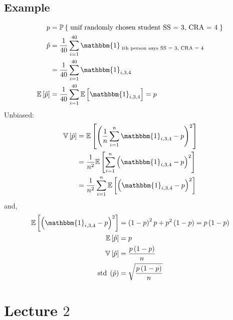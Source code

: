 \documentclass{article}
\begin{document}
\subsection{Example}
\begin{align*}
p  &= \mathbb{P}\left\{\text{\;unif randomly chosen student SS = 3, CRA = 4\;}\right\}
\\ \hat{p} &= \dfrac{1}{40} \displaystyle\sum_{i=1}^{40} \mathbbm{1}_{\text{\;ith person says SS = 3, CRA = 4\;}}
\\ &= \dfrac{1}{40} \displaystyle\sum_{i=1}^{40} \mathbbm{1}_{i,3,4}
\\ \mathbb{E}\left[\hat{p}\right] &= \dfrac{1}{40} \displaystyle\sum_{i=1}^{40} \mathbb{E}\left[\mathbbm{1}_{i,3,4}\right] = p 
\end{align*}
Unbiased:
\begin{align*}
\mathbb{V}\left[\hat{p}\right] &= \mathbb{E}\left[\left(\dfrac{1}{n} \displaystyle\sum_{i=1}^{n} \mathbbm{1}_{i,3,4} - p \right)^{2}\right]
\\ &= \dfrac{1}{n^{2}} \mathbb{E}\left[\displaystyle\sum_{i=1}^{n} \left(\mathbbm{1}_{i,3,4} - p\right)^{2}\right]
\\ &= \dfrac{1}{n^{2}} \displaystyle\sum_{i=1}^{n} \mathbb{E}\left[\left(\mathbbm{1}_{i,3,4} - p\right)^{2}\right]
\end{align*}
and,
\begin{align*}
\mathbb{E}\left[\left(\mathbbm{1}_{i,3,4} - p\right)^{2}\right] &= \left(1 - p\right)^{2} p + p^{2} \left(1 - p\right) = p  \left(1 - p\right)
\\ \mathbb{E}\left[\hat{p}\right] &= p 
\\ \mathbb{V}\left[\hat{p}\right] &= \dfrac{p \left(1 - p\right)}{n}
\\ \text{\;std\;}\left(\hat{p}\right) &= \sqrt{\dfrac{p \left(1 - p\right)}{n}}
\end{align*}





\section{Lecture $2$} 
\end{document}
